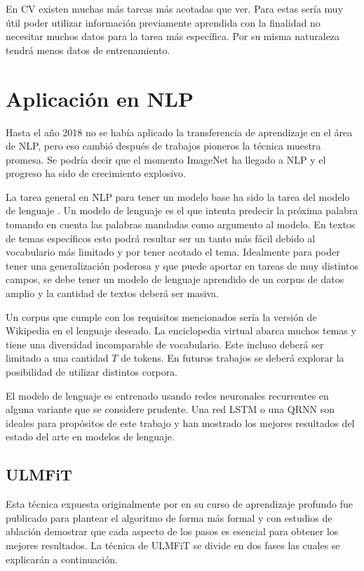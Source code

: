 En CV existen muchas más tareas más acotadas que ver. Para estas sería muy útil poder utilizar información previamente aprendida con la finalidad no necesitar muchos datos para la tarea más específica. Por su misma naturaleza tendrá menos datos de entrenamiento.

\section{Aplicación en NLP}

Hasta el año 2018 no se había aplicado la transferencia de aprendizaje en el área de NLP, pero eso cambió después de trabajos pioneros \parencite{peters:2018, howard2018, devlin2018bert} la técnica muestra promesa. Se podría decir que el momento ImageNet ha llegado a NLP y el progreso ha sido de crecimiento explosivo.

La tarea general en NLP para tener un modelo base ha sido la tarea del modelo de lenguaje \parencite{howard2018}. Un modelo de lenguaje es el que intenta predecir la próxima palabra tomando en cuenta las palabras mandadas como argumento al modelo. En textos de temas específicos esto podrá resultar ser un tanto más fácil debido al vocabulario más limitado y por tener acotado el tema. Idealmente para poder tener una generalización poderosa y que puede aportar en tareas de muy distintos campos, se debe tener un modelo de lenguaje aprendido de un corpus de datos amplio y la cantidad de textos deberá ser masiva.

Un corpus que cumple con los requisitos mencionados sería la versión de Wikipedia en el lenguaje deseado. La enciclopedia virtual abarca muchos temas y tiene una diversidad incomparable de vocabulario. Este incluso deberá ser limitado a una cantidad $T$ de tokens. En futuros trabajos se deberá explorar la posibilidad de utilizar distintos corpora.

El modelo de lenguaje es entrenado usando redes neuronales recurrentes en alguna variante que se considere prudente. Una red LSTM o una QRNN \parencite{bradbury2016} son ideales para propósitos de este trabajo y han mostrado los mejores resultados del estado del arte en modelos de lenguaje.

\subsection{ULMFiT}

Esta técnica expuesta originalmente por \textcite{howard2018} en su curso de aprendizaje profundo fue publicado para plantear el algoritmo de forma más formal y con estudios de ablación demostrar que cada aspecto de los pasos es esencial para obtener los mejores resultados. La técnica de ULMFiT se divide en dos fases \parencite{howard2018} las cuales se explicarán a continuación.

